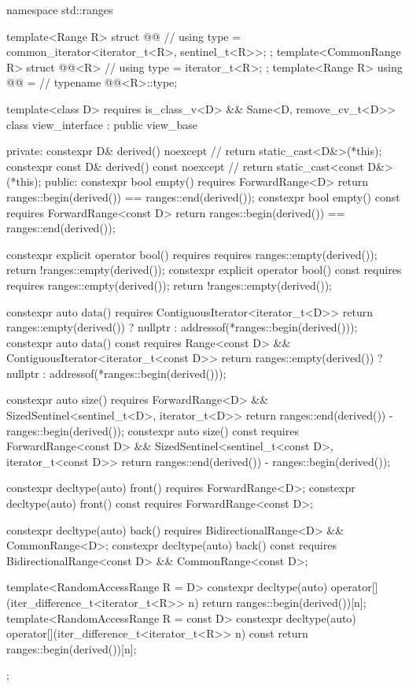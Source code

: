 %
\begin{codeblock}
namespace std::ranges {
  template<Range R>
  struct @@ {                   // \expos
    using type = common_iterator<iterator_t<R>, sentinel_t<R>>;
  };
  template<CommonRange R>
  struct @@<R> {                // \expos
    using type = iterator_t<R>;
  };
  template<Range R>
    using @@ =                       // \expos
      typename @@<R>::type;

  template<class D>
    requires is_class_v<D> && Same<D, remove_cv_t<D>>
  class view_interface : public view_base {
  private:
    constexpr D& derived() noexcept {                   // \expos
      return static_cast<D&>(*this);
    }
    constexpr const D& derived() const noexcept {       // \expos
      return static_cast<const D&>(*this);
    }
  public:
    constexpr bool empty() requires ForwardRange<D> {
      return ranges::begin(derived()) == ranges::end(derived());
    }
    constexpr bool empty() const requires ForwardRange<const D> {
      return ranges::begin(derived()) == ranges::end(derived());
    }

    constexpr explicit operator bool()
      requires requires { ranges::empty(derived()); } {
        return !ranges::empty(derived());
      }
    constexpr explicit operator bool() const
      requires requires { ranges::empty(derived()); } {
        return !ranges::empty(derived());
      }

    constexpr auto data() requires ContiguousIterator<iterator_t<D>> {
      return ranges::empty(derived()) ? nullptr : addressof(*ranges::begin(derived()));
    }
    constexpr auto data() const
      requires Range<const D> && ContiguousIterator<iterator_t<const D>> {
        return ranges::empty(derived()) ? nullptr : addressof(*ranges::begin(derived()));
      }

    constexpr auto size() requires ForwardRange<D> &&
      SizedSentinel<sentinel_t<D>, iterator_t<D>> {
        return ranges::end(derived()) - ranges::begin(derived());
      }
    constexpr auto size() const requires ForwardRange<const D> &&
      SizedSentinel<sentinel_t<const D>, iterator_t<const D>> {
        return ranges::end(derived()) - ranges::begin(derived());
      }

    constexpr decltype(auto) front() requires ForwardRange<D>;
    constexpr decltype(auto) front() const requires ForwardRange<const D>;

    constexpr decltype(auto) back() requires BidirectionalRange<D> && CommonRange<D>;
    constexpr decltype(auto) back() const
      requires BidirectionalRange<const D> && CommonRange<const D>;

    template<RandomAccessRange R = D>
      constexpr decltype(auto) operator[](iter_difference_t<iterator_t<R>> n) {
        return ranges::begin(derived())[n];
      }
    template<RandomAccessRange R = const D>
      constexpr decltype(auto) operator[](iter_difference_t<iterator_t<R>> n) const {
        return ranges::begin(derived())[n];
      }
  };
}
\end{codeblock}

